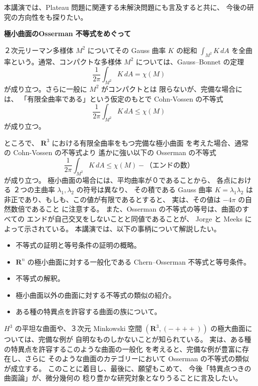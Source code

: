 \documentclass[uplatex,dvipdfmx]{jlreq}
\begin{document}
本講演では、Plateau 問題に関連する未解決問題にも言及すると共に、
今後の研究の方向性をも探りたい。

\newpage

\begin{center}
{\Large\bfseries 極小曲面のOsserman 不等式をめぐって}

\hspace*{\fill}{\large\bfseries 梅原 雅顕（広島大・理）}
\end{center}

\bigskip

２次元リーマン多様体 $M^2$ についてその Gauss 曲率 $K$ の総和
$\displaystyle\int_{M^2}K\,dA$
を全曲率という。通常、コンパクトな多様体 $M^2$ については、Gauss--Bonnet の定理
\[
\frac{1}{2\pi}\int_{M^2}K\,dA=\chi(M)
\]
が成り立つ。さらに一般に $M^2$ がコンパクトとは
限らないが、完備な場合には、
「有限全曲率である」という仮定のもとで
Cohn-Vossen の不等式
\[
\frac{1}{2\pi}\int_{M^2}K\,dA\le \chi(M)
\]
が成り立つ。

ところで、
$\mathbf R^3$ における有限全曲率をもつ完備な極小曲面
を考えた場合、通常の Cohn-Vossen の不等式より
遙かに強い以下の Osserman の不等式
\[
\frac{1}{2\pi}\int_{M^2}K\,dA\le \chi(M)-\mbox{（エンドの数）}
\]
が成り立つ。
極小曲面の場合には、平均曲率が０であることから、
各点における
２つの主曲率 $\lambda_1,\lambda_2$ の符号は異なり、
その積である Gauss 曲率 $K=\lambda_1\lambda_2$ は
非正であり、もしも、この値が有限であるとすると、
実は、その値は $-4\pi$ の自然数倍であること
に注意する。
また、Osserman の不等式の等号は、曲面のすべての
エンドが自己交叉をしないことと同値であることが、
Jorge と Meeks によって示されている。
本講演では、以下の事柄について解説したい。
\begin{itemize}
\item[$\S1$] 不等式の証明と等号条件の証明の概略。
\item[$\S2$] $\mathbf R^n$ の極小曲面に対する一般化である
Chern--Osserman 不等式と等号条件。
\item[$\S3$] 不等式の解釈。
\item[$\S4$] 極小曲面以外の曲面に対する不等式の類似の紹介。
\item[$\S5$] ある種の特異点を許容する曲面の族について。
\end{itemize}
$H^3$ の平坦な曲面や、３次元 Minkowski 空間
$(\mathbf R^3,(-+++))$ の極大曲面については、完備な例が
自明なものしかないことが知られている。
実は、ある種の特異点を許容するこのような曲面の一般化
を考えると、完備な例が豊富に存在し、さらに
そのような曲面のカテゴリーにおいて
Osserman の不等式の類似が成立する。
このことに着目し、最後に、願望もこめて、
今後「特異点つきの曲面論」が、微分幾何の
稔り豊かな研究対象となりうることに言及したい。
\end{document}
